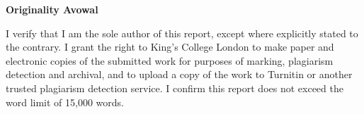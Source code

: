 \begin{center}

    \vspace*{2cm}

    {\textbf{Originality Avowal}}

    \vspace*{1cm}

\end{center}

\begin{doublespace}
    I verify that I am the sole author of this report, except where explicitly stated to the contrary. I grant the right to King's College London to make paper and electronic copies of the submitted work for purposes of marking, plagiarism detection and archival, and to upload a copy of the work to Turnitin or another trusted plagiarism detection service. I confirm this report does not exceed the word limit of 15,000 words.
\end{doublespace}

\newpage
